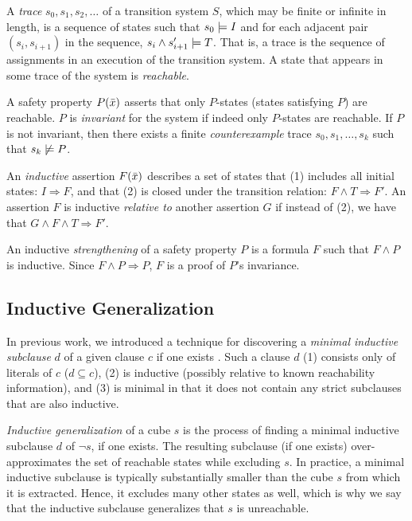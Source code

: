 \documentclass{llncs}
\newcommand{\band}{\wedge}
\newcommand{\bnot}{\neg}
\newcommand{\Bimplies}{\Rightarrow}
\begin{document}
A \emph{trace} $s_0,s_1,s_2,\ldots$ of a transition system $S$, which
may be finite or infinite in length, is a sequence of states such that
$\mymodels{I}{s_0}$ and for each adjacent pair $(s_i,s_{i+1})$ in the
sequence, $\mymodels{T}{s_i \band s_{i+1}'}$.  That is, a trace is the
sequence of assignments in an execution of the transition system.  A
state that appears in some trace of the system is \emph{reachable}.

A safety property $P(\vx)$ asserts that only $P$-states (states
satisfying $P$) are reachable.  $P$ is \emph{invariant} for the system
if indeed only $P$-states are reachable.  If $P$ is not invariant,
then there exists a finite \emph{counterexample} trace
$s_0,s_1,\ldots,s_k$ such that $\notmodels{P}{s_k}$.

An \emph{inductive} assertion $F(\vx)$ describes a set of states that
(1) includes all initial states: $I \Bimplies F$, and that (2) is
closed under the transition relation: $F \band T \Bimplies F'$.  An
assertion $F$ is inductive \emph{relative to} another assertion $G$ if
instead of (2), we have that $G \band F \band T \Bimplies F'$.

An inductive \emph{strengthening} of a safety property $P$ is a
formula $F$ such that $F \band P$ is inductive.  Since $F \band P
\Bimplies P$, $F$ is a proof of $P$'s invariance.

\subsection{Inductive Generalization}
\label{subsec:ig}

In previous work, we introduced a technique for discovering a
\emph{minimal inductive subclause} $d$ of a given clause $c$ if one
exists \cite{Bradley+Manna/2007}.  Such a clause $d$ (1) consists only
of literals of $c$ ($d \subseteq c$), (2) is inductive (possibly
relative to known reachability information), and (3) is minimal in
that it does not contain any strict subclauses that are also
inductive.

\emph{Inductive generalization} of a cube $s$ is the process of
finding a minimal inductive subclause $d$ of $\bnot s$, if one exists.
The resulting subclause (if one exists) over-approximates the set of
reachable states while excluding $s$.  In practice, a minimal
inductive subclause is typically substantially smaller than the cube
$s$ from which it is extracted.  Hence, it excludes many other states
as well, which is why we say that the inductive subclause generalizes
that $s$ is unreachable.
\end{document}
